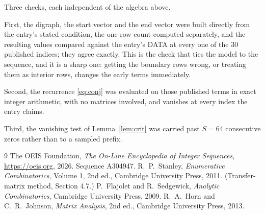 \documentclass[11pt,a4paper]{article}
\theoremstyle{plain}
\theoremstyle{definition}
\begin{document}
Three checks, each independent of the algebra above.

First, the digraph, the start vector and the end vector were built directly from the
entry's stated condition, the one-row count computed separately, and the resulting values
compared against the entry's DATA at every one of the $30$ published indices; they
agree exactly. This is the check that ties the model to the sequence, and it is a sharp one:
getting the boundary rows wrong, or treating them as interior rows, changes the early terms
immediately.

Second, the recurrence \eqref{eq:conj} was evaluated on those published terms in exact
integer arithmetic, with no matrices involved, and vanishes at every index the entry claims.

Third, the vanishing test of Lemma~\ref{lem:crit} was carried past $S=64$ consecutive
zeros rather than to a sampled prefix.

\begin{thebibliography}{9}
 The OEIS Foundation, \emph{The On-Line Encyclopedia of Integer
Sequences}, \url{https://oeis.org}, 2026. Sequence A304947.
 R.~P.~Stanley, \emph{Enumerative Combinatorics}, Volume 1, 2nd ed.,
Cambridge University Press, 2011. (Transfer-matrix method, Section 4.7.)
 P.~Flajolet and R.~Sedgewick, \emph{Analytic Combinatorics}, Cambridge
University Press, 2009.
 R.~A.~Horn and C.~R.~Johnson, \emph{Matrix Analysis}, 2nd ed., Cambridge
University Press, 2013.
\end{thebibliography}
\end{document}
